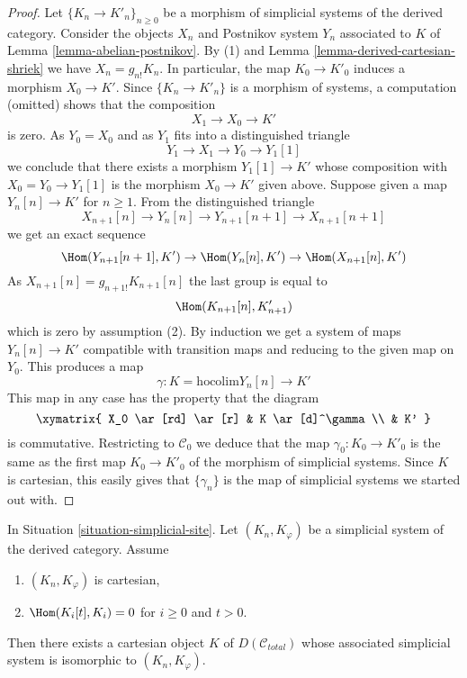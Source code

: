 \begin{proof}
Let $\{K_n \to K'_n\}_{n \geq 0}$
be a morphism of simplicial systems of the derived category.
Consider the objects $X_n$ and Postnikov system $Y_n$
associated to $K$ of Lemma \ref{lemma-abelian-postnikov}.
By (1) and Lemma \ref{lemma-derived-cartesian-shriek} we have
$X_n = g_{n!}K_n$. In particular, the map $K_0 \to K'_0$
induces a morphism $X_0 \to K'$. Since $\{K_n \to K'_n\}$
is a morphism of systems, a computation (omitted) shows that
the composition
$$
X_1 \to X_0 \to K'
$$
is zero. As $Y_0 = X_0$ and as $Y_1$ fits into a distinguished
triangle
$$
Y_1 \to X_1 \to Y_0 \to Y_1[1]
$$
we conclude that there exists a morphism $Y_1[1] \to K'$ whose
composition with $X_0 = Y_0 \to Y_1[1]$ is the morphism $X_0 \to K'$
given above. Suppose given a map $Y_n[n] \to K'$ for $n \geq 1$.
From the distinguished triangle
$$
X_{n + 1}[n] \to Y_n[n] \to Y_{n + 1}[n + 1] \to X_{n + 1}[n + 1]
$$
we get an exact sequence
$$
\Hom(Y_{n + 1}[n + 1], K') \to
\Hom(Y_n[n], K') \to
\Hom(X_{n + 1}[n], K')
$$
As $X_{n + 1}[n] = g_{n + 1!}K_{n + 1}[n]$ the last group is equal to
$$
\Hom(K_{n + 1}[n], K'_{n + 1})
$$
which is zero by assumption (2). By induction we get a system of
maps $Y_n[n] \to K'$ compatible with transition maps and reducing
to the given map on $Y_0$. This produces a map
$$
\gamma :
K = \text{hocolim} Y_n[n]
\longrightarrow
K'
$$
This map in any case has the property that the diagram
$$
\xymatrix{
X_0 \ar[rd] \ar[r] &
K \ar[d]^\gamma \\
& K'
}
$$
is commutative. Restricting to
$\mathcal{C}_0$ we deduce that the map $\gamma_0 : K_0 \to K'_0$
is the same as the first map $K_0 \to K'_0$ of the morphism
of simplicial systems. Since $K$ is cartesian, this easily gives that
$\{\gamma_n\}$ is the map of simplicial systems we started out with.
\end{proof}

\begin{lemma}
\label{lemma-cartesian-object-derived-from-simplicial}
In Situation \ref{situation-simplicial-site}. Let
$(K_n, K_\varphi)$ be a simplicial system of the derived category.
Assume
\begin{enumerate}
\item $(K_n, K_\varphi)$ is cartesian,
\item $\Hom(K_i[t], K_i) = 0$ for $i \geq 0$ and $t > 0$.
\end{enumerate}
Then there exists a cartesian object $K$ of $D(\mathcal{C}_{total})$
whose associated simplicial system is isomorphic to $(K_n, K_\varphi)$.
\end{lemma}

